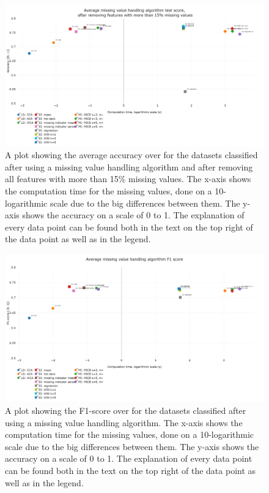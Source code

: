 \documentclass[10pt,a4paper]{article}
\begin{document}
	\begin{figure}[H]
	\centering
	\includegraphics[angle=90,height=0.9\textheight]{avg_acc_15aca.PNG}
	\caption{A plot showing the average accuracy over for the datasets classified after using a missing value handling algorithm and after removing all features with more than 15\% missing values. The x-axis shows the computation time for the missing values, done on a 10-logarithmic scale due to the big differences between them. The y-axis shows the accuracy on a scale of 0 to 1. The explanation of every data point can be found both in the text on the top right of the data point as well as in the legend.}
	\label{fig:EvalAvgAccExtraACA}
	\end{figure}

\begin{figure}[H]
	\centering
	\includegraphics[angle=90,height=0.9\textheight]{avg_F1.PNG}
	\caption{A plot showing the F1-score over for the datasets classified after using a missing value handling algorithm. The x-axis shows the computation time for the missing values, done on a 10-logarithmic scale due to the big differences between them. The y-axis shows the accuracy on a scale of 0 to 1. The explanation of every data point can be found both in the text on the top right of the data point as well as in the legend.}
	\label{fig:EvalAvgF1}
\end{figure}
\end{document}
